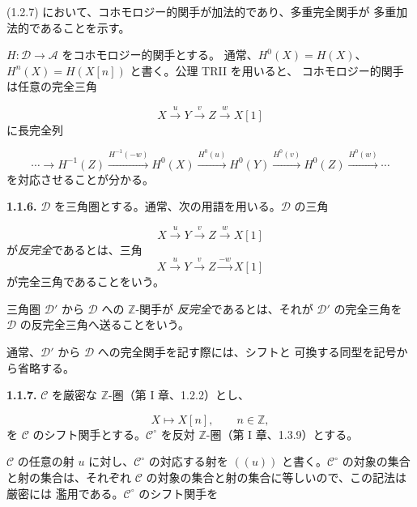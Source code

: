 \clearpage
{}%
\begingroup
\small
\setlength{\abovedisplayskip}{4pt plus 2pt minus 2pt}%
\setlength{\belowdisplayskip}{4pt plus 2pt minus 2pt}%

\noindent (1.2.7) において、コホモロジー的関手が加法的であり、多重完全関手が
多重加法的であることを示す。

$H\colon\mathcal D\longrightarrow\mathcal A$ をコホモロジー的関手とする。
通常、$H^0(X)=H(X)$、$H^n(X)=H(X[n])$ と書く。公理 TRII を用いると、
コホモロジー的関手は任意の完全三角

\[
  X\xrightarrow{u}Y\xrightarrow{v}Z\xrightarrow{w}X[1]
\]
に長完全列

\begin{equation}
  \cdots\longrightarrow H^{-1}(Z)
  \xrightarrow{H^{-1}(-w)}H^0(X)
  \xrightarrow{H^0(u)}H^0(Y)
  \xrightarrow{H^0(v)}H^0(Z)
  \xrightarrow{H^0(w)}\cdots
  \tag{1.1.5.1}
\end{equation}
を対応させることが分かる。

\medskip
\noindent\textbf{1.1.6.}\quad
$\mathcal D$ を三角圏とする。通常、次の用語を用いる。$\mathcal D$ の三角

\[
  X\xrightarrow{u}Y\xrightarrow{v}Z\xrightarrow{w}X[1]
\]
が\emph{反完全}であるとは、三角
\[
  X\xrightarrow{u}Y\xrightarrow{v}Z\xrightarrow{-w}X[1]
\]
が完全三角であることをいう。

三角圏 $\mathcal D'$ から $\mathcal D$ への $\mathbb Z$-関手が
\emph{反完全}であるとは、それが $\mathcal D'$ の完全三角を
$\mathcal D$ の反完全三角へ送ることをいう。

通常、$\mathcal D'$ から $\mathcal D$ への完全関手を記す際には、シフトと
可換する同型を記号から省略する。

\medskip
\noindent\textbf{1.1.7.}\quad
$\mathcal C$ を厳密な $\mathbb Z$-圏（第 I 章、1.2.2）とし、

\[
  X\longmapsto X[n],\qquad n\in\mathbb Z,
\]
を $\mathcal C$ のシフト関手とする。$\mathcal C^\circ$ を反対
$\mathbb Z$-圏（第 I 章、1.3.9）とする。

$\mathcal C$ の任意の射 $u$ に対し、$\mathcal C^\circ$ の対応する射を
$((u))$ と書く。$\mathcal C^\circ$ の対象の集合と射の集合は、それぞれ
$\mathcal C$ の対象の集合と射の集合に等しいので、この記法は厳密には
濫用である。$\mathcal C^\circ$ のシフト関手を

